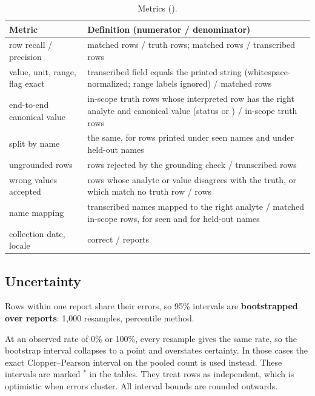 \documentclass[11pt,a4paper]{article}
\newcommand{\code}[1]{\texttt{\detokenize{#1}}}
\begin{document}
\begin{table}[h]
\centering\small
\begin{tabularx}{\linewidth}{@{}l>{\raggedright\arraybackslash}X@{}}
\toprule
Metric & Definition (numerator / denominator) \\
\midrule
row recall / precision & matched rows / truth rows; matched rows / transcribed rows \\
value, unit, range, flag exact & transcribed field equals the printed string (whitespace-normalized; range labels ignored) / matched rows \\
end-to-end canonical value & in-scope truth rows whose interpreted row has the right analyte and canonical value (status \code{ok} or \code{implausible}) / in-scope truth rows \\
\quad split by name & the same, for rows printed under seen names and under held-out names \\
ungrounded rows & rows rejected by the grounding check / transcribed rows \\
wrong values accepted & \code{ok} rows whose analyte or value disagrees with the truth, or which match no truth row / \code{ok} rows \\
name mapping & transcribed names mapped to the right analyte / matched in-scope rows, for seen and for held-out names \\
collection date, locale & correct / reports \\
\bottomrule
\end{tabularx}
\caption{Metrics (\code{scripts/evaluate_extraction.py}).}
\label{tab:metrics}
\end{table}

\subsection{Uncertainty}
Rows within one report share their errors, so 95\% intervals are \textbf{bootstrapped over reports}: 1,000 resamples, percentile method.

At an observed rate of 0\% or 100\%, every resample gives the same rate, so the bootstrap interval collapses to a point and overstates certainty. In those cases the exact Clopper--Pearson interval on the pooled count is used instead. These intervals are marked $^*$ in the tables. They treat rows as independent, which is optimistic when errors cluster. All interval bounds are rounded outwards.
\end{document}
